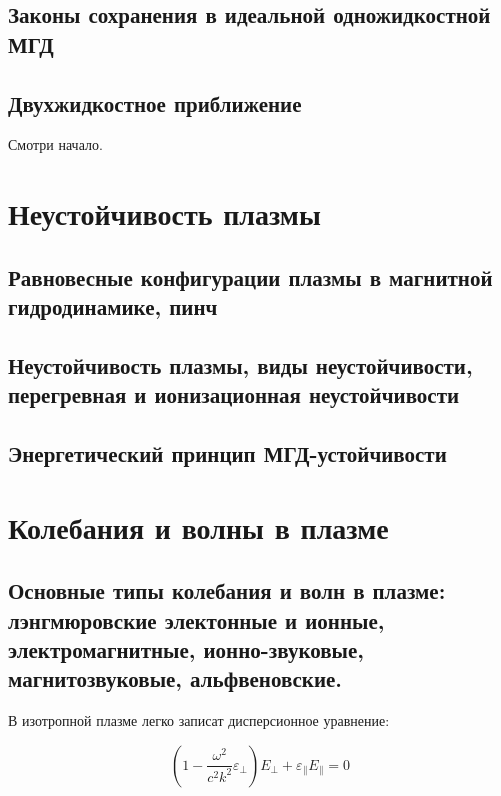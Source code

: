 \documentclass[10pt, a4paper]{article}
\numberwithin{equation}{section}
\begin{document}
\subsection{Законы сохранения в идеальной одножидкостной МГД}

\subsection{Двухжидкостное приближение}

Смотри начало.

\section{Неустойчивость плазмы}

\subsection{Равновесные конфигурации плазмы в магнитной гидродинамике, пинч}

\subsection{Неустойчивость плазмы, виды неустойчивости, перегревная и ионизационная неустойчивости}

\subsection{Энергетический принцип МГД-устойчивости}

\section{Колебания и волны в плазме}
\label{sec.7}

\subsection{Основные типы колебания и волн в плазме: лэнгмюровские электонные и ионные, электромагнитные, ионно-звуковые, магнитозвуковые, альфвеновские.}
\label{sec.7.1}

В изотропной плазме легко записат дисперсионное уравнение:

\begin{equation}
    \label{eq.7.1}
    \left(1-\frac{\omega^2}{c^2 k^2} \varepsilon_{\perp}\right) E_{\perp} + \varepsilon_{\parallel} E_{\parallel}= 0
\end{equation}
\end{document}
